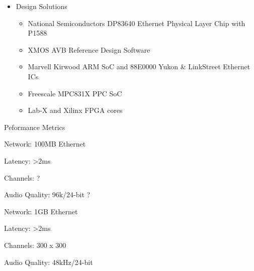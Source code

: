 
\begin{itemize}
	\item Design Solutions
	\begin{itemize}
		\item National Semiconductors DP83640 Ethernet Physical Layer Chip with P1588 
		\item XMOS AVB Reference Design Software
		\item Marvell Kirwood ARM SoC and 88E0000 Yukon \& LinkStreet Ethernet ICs
		\item Freescale MPC831X PPC SoC
		\item Lab-X and Xilinx FPGA cores
	\end{itemize}
\end{itemize}


{ Peformance Metrics }
\item Network: 100MB Ethernet
\item Latency: >2ms
\item Channels: ?
\item Audio Quality: 96k/24-bit ?

\item Network: 1GB Ethernet
\item Latency: >2ms
\item Channels: 300 x 300
\item Audio Quality: 48kHz/24-bit
